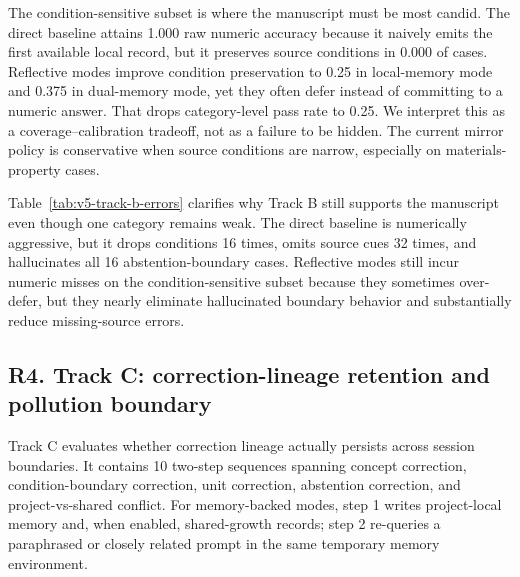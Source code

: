 \documentclass[12pt]{article}
\begin{document}
The condition-sensitive subset is where the manuscript must be most candid. The direct baseline attains 1.000 raw numeric accuracy because it naively emits the first available local record, but it preserves source conditions in 0.000 of cases. Reflective modes improve condition preservation to 0.25 in local-memory mode and 0.375 in dual-memory mode, yet they often defer instead of committing to a numeric answer. That drops category-level pass rate to 0.25. We interpret this as a coverage--calibration tradeoff, not as a failure to be hidden. The current mirror policy is conservative when source conditions are narrow, especially on materials-property cases.

\begin{table}[H]
\centering
{}
\caption{Table 5. Track B error taxonomy counts across the 48-case science benchmark.}
\label{tab:v5-track-b-errors}
\end{table}

Table~\ref{tab:v5-track-b-errors} clarifies why Track B still supports the manuscript even though one category remains weak. The direct baseline is numerically aggressive, but it drops conditions 16 times, omits source cues 32 times, and hallucinates all 16 abstention-boundary cases. Reflective modes still incur numeric misses on the condition-sensitive subset because they sometimes over-defer, but they nearly eliminate hallucinated boundary behavior and substantially reduce missing-source errors.

\subsection{R4. Track C: correction-lineage retention and pollution boundary}

Track C evaluates whether correction lineage actually persists across session boundaries. It contains 10 two-step sequences spanning concept correction, condition-boundary correction, unit correction, abstention correction, and project-vs-shared conflict. For memory-backed modes, step 1 writes project-local memory and, when enabled, shared-growth records; step 2 re-queries a paraphrased or closely related prompt in the same temporary memory environment.
\end{document}
